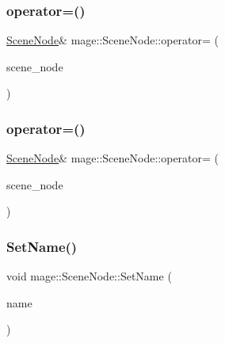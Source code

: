 \hypertarget{classmage_1_1_scene_node_af4298cbc808139f9da43055afdfe8f7e}{}\label{classmage_1_1_scene_node_af4298cbc808139f9da43055afdfe8f7e} 
\subsubsection{\texorpdfstring{operator=()}{operator=()}\hspace{0.1cm}{\footnotesize\ttfamily [1/2]}}
{\footnotesize\ttfamily \hyperlink{classmage_1_1_scene_node}{Scene\+Node}\& mage\+::\+Scene\+Node\+::operator= (\begin{DoxyParamCaption}\item[{const \hyperlink{classmage_1_1_scene_node}{Scene\+Node} \&}]{scene\+\_\+node }\end{DoxyParamCaption})\hspace{0.3cm}{\ttfamily [delete]}}

\hypertarget{classmage_1_1_scene_node_ae38092ba9ec8449f15b3c1f8285ba500}{}\label{classmage_1_1_scene_node_ae38092ba9ec8449f15b3c1f8285ba500} 
\subsubsection{\texorpdfstring{operator=()}{operator=()}\hspace{0.1cm}{\footnotesize\ttfamily [2/2]}}
{\footnotesize\ttfamily \hyperlink{classmage_1_1_scene_node}{Scene\+Node}\& mage\+::\+Scene\+Node\+::operator= (\begin{DoxyParamCaption}\item[{\hyperlink{classmage_1_1_scene_node}{Scene\+Node} \&\&}]{scene\+\_\+node }\end{DoxyParamCaption})\hspace{0.3cm}{\ttfamily [delete]}}

\hypertarget{classmage_1_1_scene_node_a11a6d53a9ba637813b34347b68ad08d6}{}\label{classmage_1_1_scene_node_a11a6d53a9ba637813b34347b68ad08d6} 
\subsubsection{\texorpdfstring{Set\+Name()}{SetName()}\hspace{0.1cm}{\footnotesize\ttfamily [1/2]}}
{\footnotesize\ttfamily void mage\+::\+Scene\+Node\+::\+Set\+Name (\begin{DoxyParamCaption}\item[{const string \&}]{name }\end{DoxyParamCaption})}

